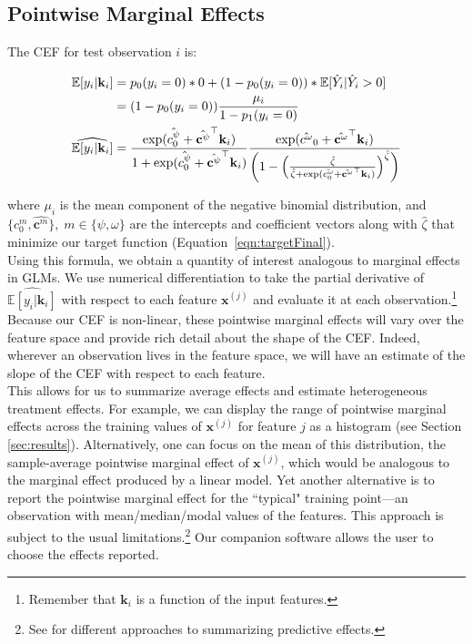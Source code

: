 \documentclass[12pt]{article}
\newcommand{\x}{\mathbf{x}}
\renewcommand{\k}{\mathbf{k}}
\newcommand{\bc}{\mathbf{c}}
\renewcommand{\r}{\right}
\renewcommand{\l}{\left}
\newcommand{\E}{\mathbb{E}}
\begin{document}
\subsection{Pointwise Marginal Effects}
\label{sec:pwmfx}
The CEF for test observation $i$ is:

\begin{align}
  \E[y_i|\k_i] &= p_0(y_i=0)*0 + (1-p_0(y_i=0))*\E[\hat{Y}_i | \hat{Y}_i > 0] \notag \\
  & =  ( 1-p_0(y_i=0) ) \frac{\mu_i}{1-p_1(y_i=0)} \notag \\
  \widehat{\E[y_i|\k_i]} &= \frac{\exp(\hat{c^\psi_0} + \hat{\bc^\psi}^\top \k_i)}{1 + \exp(\hat{c^\psi_0} + \hat{\bc^\psi}^\top \k_i)} \frac{\exp(\hat{c^\omega}_0 + \hat{\bc^\omega}^\top \k_i)}{\l( 1 - \l( \frac{\hat{\zeta}}{\hat{\zeta} + \exp(\hat{c^\omega_0} + \hat{\bc^\omega}^\top \k_i)} \r)^{\hat{\zeta}} \r)}
\end{align} 

where $\mu_i$ is the mean component of the negative binomial distribution, and $\{c^m_0, \hat{\bc^m}\}, \; m \in \{\psi,\omega\}$ are the intercepts and coefficient vectors along with $\hat{\zeta}$ that minimize our target function (Equation~\ref{eqn:targetFinal}).	\\

Using this formula, we obtain a quantity of interest analogous to marginal effects in GLMs. We use numerical differentiation to take the partial derivative of $\widehat{\E[y_i|\k_i]}$ with respect to each feature $\x^{(j)}$ and evaluate it at each observation.\footnote{Remember that $\k_i$ is a function of the input features.} Because our CEF is non-linear, these pointwise marginal effects will vary over the feature space and provide rich detail about the shape of the CEF. Indeed, wherever an observation lives in the feature space, we will have an estimate of the slope of the CEF with respect to each feature.  \\

This allows for us to summarize average effects and estimate heterogeneous treatment effects. For example, we can display the range of pointwise marginal effects across the training values of $\x^{(j)}$ for feature $j$ as a histogram (see Section \ref{sec:results}).  Alternatively, one can focus on the mean of this distribution, the sample-average pointwise marginal effect of $\x^{(j)}$, which would be analogous to the marginal effect produced by a linear model. Yet another alternative is to report the pointwise marginal effect for the ``typical" training point---an observation with mean/median/modal values of the features. This approach is subject to the usual limitations.\footnote{See \cite{Gelman2006} for different approaches to summarizing predictive effects.} Our companion software allows the user to choose the effects reported. 	\\  
\end{document}
